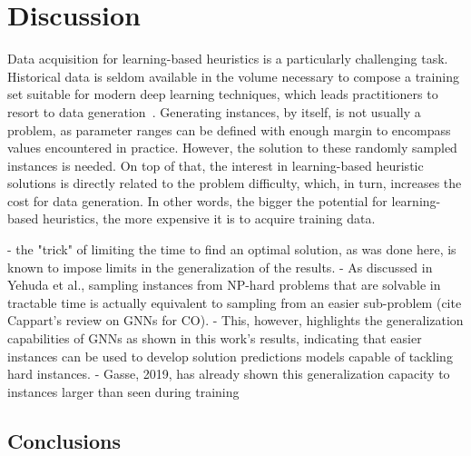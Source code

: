 

\chapter{Discussion}

Data acquisition for learning-based heuristics is a particularly challenging task. 
Historical data is seldom available in the volume necessary to compose a training set suitable for modern deep learning techniques, which leads practitioners to resort to data generation~\cite{bengioMachineLearningCombinatorial2021}.
Generating instances, by itself, is not usually a problem, as parameter ranges can be defined with enough margin to encompass values encountered in practice.
However, the solution to these randomly sampled instances is needed.
On top of that, the interest in learning-based heuristic solutions is directly related to the problem difficulty, which, in turn, increases the cost for data generation.
In other words, the bigger the potential for learning-based heuristics, the more expensive it is to acquire training data.

- the "trick" of limiting the time to find an optimal solution, as was done here, is known to impose limits in the generalization of the results.
- As discussed in Yehuda et al., sampling instances from NP-hard problems that are solvable in tractable time is actually equivalent to sampling from an easier sub-problem (cite Cappart's review on GNNs for CO). 
- This, however, highlights the generalization capabilities of GNNs as shown in this work's results, indicating that easier instances can be used to develop solution predictions models capable of tackling hard instances.
- Gasse, 2019, has already shown this generalization capacity to instances larger than seen during training

\section{Conclusions}


